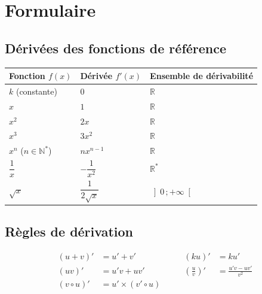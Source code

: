 
\chapter*{Formulaire}

\section*{Dérivées des fonctions de référence}

\begin{center}
\renewcommand{\arraystretch}{1.5}
\begin{tabular}{lll}
\toprule
\textbf{Fonction $f(x)$} & \textbf{Dérivée $f'(x)$} & \textbf{Ensemble de dérivabilité} \\
\midrule
$k$ (constante)        & $0$                   & $\mathbb{R}$ \\
$x$                    & $1$                   & $\mathbb{R}$ \\
$x^2$                  & $2x$                  & $\mathbb{R}$ \\
$x^3$                  & $3x^2$                & $\mathbb{R}$ \\
$x^n$ ($n \in \mathbb{N}^*$) & $nx^{n-1}$     & $\mathbb{R}$ \\
$\dfrac{1}{x}$         & $-\dfrac{1}{x^2}$     & $\mathbb{R}^*$ \\
$\sqrt{x}$             & $\dfrac{1}{2\sqrt{x}}$ & $\left]0\,;+\infty\right[$ \\
\bottomrule
\end{tabular}
\end{center}

\section*{Règles de dérivation}

\begin{align*}
(u + v)'     &= u' + v'              &\qquad (ku)'   &= ku'  \\
(uv)'        &= u'v + uv'            &\qquad \left(\frac{u}{v}\right)' &= \frac{u'v - uv'}{v^2} \\
(v \circ u)' &= u' \times (v' \circ u)
\end{align*}


